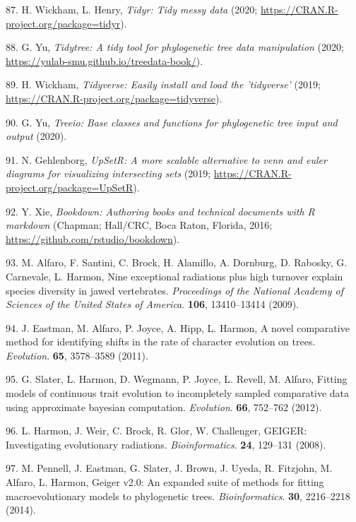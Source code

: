 \documentclass[]{elsarticle} %
\begin{document}
\leavevmode\hypertarget{ref-R-tidyr}{}%
87. H. Wickham, L. Henry, \emph{Tidyr: Tidy messy data} (2020; \url{https://CRAN.R-project.org/package=tidyr}).

\leavevmode\hypertarget{ref-R-tidytree}{}%
88. G. Yu, \emph{Tidytree: A tidy tool for phylogenetic tree data manipulation} (2020; \url{https://yulab-smu.github.io/treedata-book/}).

\leavevmode\hypertarget{ref-R-tidyverse}{}%
89. H. Wickham, \emph{Tidyverse: Easily install and load the 'tidyverse'} (2019; \url{https://CRAN.R-project.org/package=tidyverse}).

\leavevmode\hypertarget{ref-R-treeio}{}%
90. G. Yu, \emph{Treeio: Base classes and functions for phylogenetic tree input and output} (2020).

\leavevmode\hypertarget{ref-R-UpSetR}{}%
91. N. Gehlenborg, \emph{UpSetR: A more scalable alternative to venn and euler diagrams for visualizing intersecting sets} (2019; \url{https://CRAN.R-project.org/package=UpSetR}).

\leavevmode\hypertarget{ref-bookdown2016}{}%
92. Y. Xie, \emph{Bookdown: Authoring books and technical documents with R markdown} (Chapman; Hall/CRC, Boca Raton, Florida, 2016; \url{https://github.com/rstudio/bookdown}).

\leavevmode\hypertarget{ref-geiger2009}{}%
93. M. Alfaro, F. Santini, C. Brock, H. Alamillo, A. Dornburg, D. Rabosky, G. Carnevale, L. Harmon, Nine exceptional radiations plus high turnover explain species diversity in jawed vertebrates. \emph{Proceedings of the National Academy of Sciences of the United States of America}. \textbf{106}, 13410--13414 (2009).

\leavevmode\hypertarget{ref-geiger2011}{}%
94. J. Eastman, M. Alfaro, P. Joyce, A. Hipp, L. Harmon, A novel comparative method for identifying shifts in the rate of character evolution on trees. \emph{Evolution}. \textbf{65}, 3578--3589 (2011).

\leavevmode\hypertarget{ref-geiger2012}{}%
95. G. Slater, L. Harmon, D. Wegmann, P. Joyce, L. Revell, M. Alfaro, Fitting models of continuous trait evolution to incompletely sampled comparative data using approximate bayesian computation. \emph{Evolution}. \textbf{66}, 752--762 (2012).

\leavevmode\hypertarget{ref-geiger2008}{}%
96. L. Harmon, J. Weir, C. Brock, R. Glor, W. Challenger, GEIGER: Investigating evolutionary radiations. \emph{Bioinformatics}. \textbf{24}, 129--131 (2008).

\leavevmode\hypertarget{ref-geiger2014}{}%
97. M. Pennell, J. Eastman, G. Slater, J. Brown, J. Uyeda, R. Fitzjohn, M. Alfaro, L. Harmon, Geiger v2.0: An expanded suite of methods for fitting macroevolutionary models to phylogenetic trees. \emph{Bioinformatics}. \textbf{30}, 2216--2218 (2014).
\end{document}
